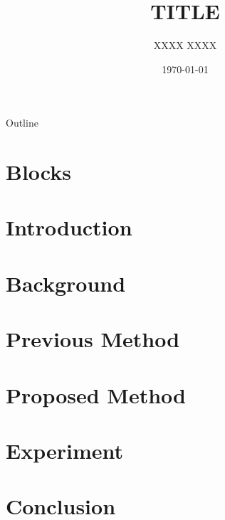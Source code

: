 \documentclass[aspectratio=169, 10.5pt]{beamer}
\title{TITLE}
\author{XXXX XXXX}
\date{\today}
\institute{INSTITUTE}
\begin{document}
\maketitle

\begin{frame}{Outline}
  \tableofcontents
\end{frame}

\section{Blocks}


\section{Introduction}


\section{Background}


\section{Previous Method}


\section{Proposed Method}


\section{Experiment}


\section{Conclusion}



\end{document}

